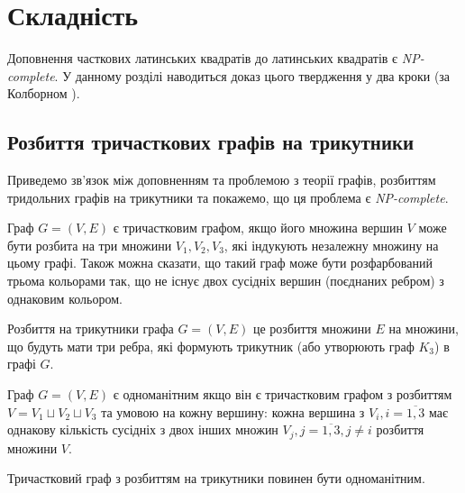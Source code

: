 \chapter{Складність}
Доповнення часткових латинських квадратів до латинських квадратів є \emph{NP-complete}. У данному розділі наводиться доказ цього твердження у два кроки (за Колборном \cite{colbourn82}).

\section{Розбиття тричасткових графів на трикутники}

Приведемо зв'язок між доповненням та проблемою з теорії графів, розбиттям тридольних графів на трикутники та покажемо, що ця проблема є \emph{NP-complete}.

\begin{definition}
    Граф $G = (V, E)$ є тричастковим графом, якщо його множина вершин $V$ може бути розбита на три множини $V_1, V_2, V_3$, які індукують незалежну множину на цьому графі. Також можна сказати, що такий граф може бути розфарбований трьома кольорами так, що не існує двох сусідніх вершин  (поєднаних ребром) з однаковим кольором.
\end{definition}

\begin{definition}
    Розбиття на трикутники графа $G = (V, E)$ це розбиття множини $E$ на множини, що будуть мати три ребра, які формують трикутник (або утворюють граф $K_3$) в графі $G$. 
\end{definition}

\begin{definition}
    Граф $G = (V, E)$ є одноманітним якщо він є тричастковим графом з розбиттям $V = V_1 \sqcup V_2 \sqcup V_3$ та умовою на кожну вершину: кожна вершина з $V_i, i = \overline{1, 3}$ має однакову кількість сусідніх з двох інших множин $V_j, j = \overline{1,3}, j \not= i$ розбиття множини $V$.
\end{definition}

Тричастковий граф з розбиттям на трикутники повинен бути одноманітним.

